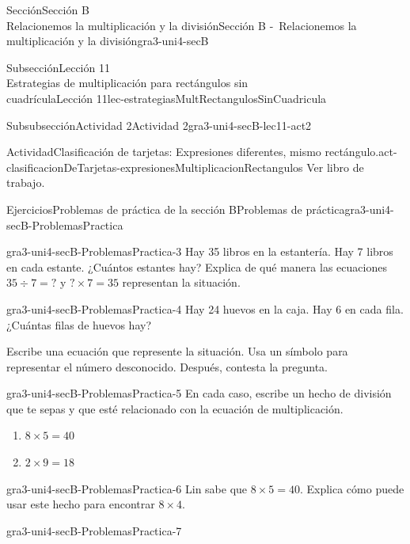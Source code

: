\begin{sectionptx}{Sección}{{\Large Sección B\\}Relacionemos la multiplicación y la división}{}{Sección B -~Relacionemos la multiplicación y la división}{}{}{gra3-uni4-secB}
\begin{subsectionptx}{Subsección}{{\normalsize Lección 11\\[-0.05cm]}Estrategias de multiplicación para rectángulos sin\\cuadrícula}{}{Lección 11}{}{}{lec-estrategiasMultRectangulosSinCuadricula}
\begin{subsubsectionptx}{Subsubsección}{Actividad 2}{}{Actividad 2}{}{}{gra3-uni4-secB-lec11-act2}
\begin{activity}{Actividad}{Clasificación de tarjetas: Expresiones diferentes, mismo rectángulo.}{act-clasificacionDeTarjetas-expresionesMultiplicacionRectangulos}
Ver libro de trabajo.
\end{activity}%
\end{subsubsectionptx}
\end{subsectionptx}
%
%
\typeout{************************************************}
\typeout{************************************************}
%
\begin{exercises-subsection}{Ejercicios}{Problemas de práctica de la sección B}{}{Problemas de práctica}{}{}{gra3-uni4-secB-ProblemasPractica}
\begin{divisionexercise}{1}{}{}{gra3-uni4-secB-ProblemasPractica-3}%
Hay 35 libros en la estantería. Hay 7 libros en cada estante. ¿Cuántos estantes hay? Explica de qué manera las ecuaciones \(35 \div 7 = {?}\) y \({?} \times 7 = 35\) representan la situación.%
\end{divisionexercise}%
\begin{divisionexercise}{2}{}{}{gra3-uni4-secB-ProblemasPractica-4}%
Hay 24 huevos en la caja. Hay 6 en cada fila. ¿Cuántas filas de huevos hay?%
\par
Escribe una ecuación que represente la situación. Usa un símbolo para representar el número desconocido. Después, contesta la pregunta.%
\end{divisionexercise}%
\begin{divisionexercise}{3}{}{}{gra3-uni4-secB-ProblemasPractica-5}%
En cada caso, escribe un hecho de división que te sepas y que esté relacionado con la ecuación de multiplicación.%
%
\begin{enumerate}[label={(\alph*)}]
\item{}\(\displaystyle 8 \times 5 = 40\)%
\item{}\(\displaystyle 2 \times 9 = 18\)%
\end{enumerate}
\end{divisionexercise}%
\begin{divisionexercise}{4}{}{}{gra3-uni4-secB-ProblemasPractica-6}%
Lin sabe que \(8 \times 5 = 40\). Explica cómo puede usar este hecho para encontrar \(8 \times 4\).%
\end{divisionexercise}%
\begin{divisionexercise}{5}{}{}{gra3-uni4-secB-ProblemasPractica-7}%
%
\vspace{-1.4\baselineskip}

\end{divisionexercise}
\end{exercises-subsection}
\end{sectionptx}
